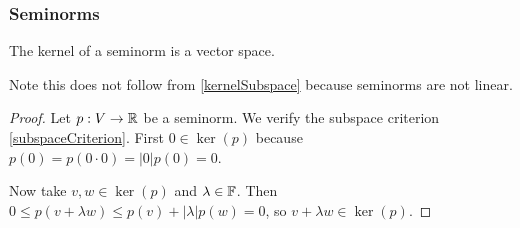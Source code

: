 \subsubsection{Seminorms}
\begin{lemma}
The kernel of a seminorm is a vector space.
\end{lemma}
Note this does not follow from \ref{kernelSubspace} because seminorms are not linear.
\begin{proof}
Let $p:V\to \mathbb{R}$ be a seminorm. We verify the subspace criterion \ref{subspaceCriterion}. First $0\in\ker(p)$ because $p(0) = p(0\cdot 0) = |0|p(0) = 0$.

Now take $v,w\in \ker(p)$ and $\lambda\in \mathbb{F}$. Then $0\leq p(v+\lambda w) \leq p(v)+|\lambda|p(w) = 0$, so $v+\lambda w\in\ker(p)$.
\end{proof}

